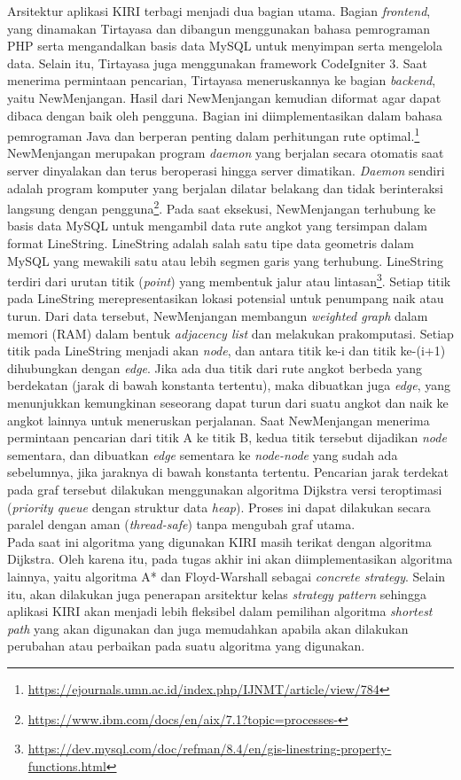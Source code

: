 \documentclass[a4paper,twoside]{article}
\begin{document}
\noindent
Arsitektur aplikasi KIRI terbagi menjadi dua bagian utama. Bagian \textit{frontend}, yang dinamakan Tirtayasa dan dibangun menggunakan bahasa pemrograman PHP serta mengandalkan basis data MySQL untuk menyimpan serta mengelola data. Selain itu, Tirtayasa juga menggunakan framework CodeIgniter 3. Saat menerima permintaan pencarian, Tirtayasa meneruskannya ke bagian \textit{backend}, yaitu NewMenjangan. Hasil dari NewMenjangan kemudian diformat agar dapat dibaca dengan baik oleh pengguna. Bagian ini diimplementasikan dalam bahasa pemrograman Java dan berperan penting dalam perhitungan rute optimal.\footnote{\url{https://ejournals.umn.ac.id/index.php/IJNMT/article/view/784}}
\\
NewMenjangan merupakan program \textit{daemon} yang berjalan secara otomatis saat server dinyalakan dan terus beroperasi hingga server dimatikan. \textit{Daemon} sendiri adalah program komputer yang berjalan dilatar belakang dan tidak berinteraksi langsung dengan pengguna\footnote{\url{https://www.ibm.com/docs/en/aix/7.1?topic=processes-}}. Pada saat eksekusi, NewMenjangan terhubung ke basis data MySQL untuk mengambil data rute angkot yang tersimpan dalam format LineString. LineString adalah salah satu tipe data geometris dalam MySQL yang mewakili satu atau lebih segmen garis yang terhubung. LineString terdiri dari urutan titik (\textit{point}) yang membentuk jalur atau lintasan\footnote{\url{https://dev.mysql.com/doc/refman/8.4/en/gis-linestring-property-functions.html}}. Setiap titik pada LineString merepresentasikan lokasi potensial untuk penumpang naik atau turun. Dari data tersebut, NewMenjangan membangun \textit{weighted graph} dalam memori (RAM) dalam bentuk \textit{adjacency list} dan melakukan prakomputasi. Setiap titik pada LineString menjadi akan \textit{node}, dan antara titik ke-i dan titik ke-(i+1) dihubungkan dengan \textit{edge}. Jika ada dua titik dari rute angkot berbeda yang berdekatan (jarak di bawah konstanta tertentu), maka dibuatkan juga \textit{edge}, yang menunjukkan kemungkinan seseorang dapat turun dari suatu angkot dan naik ke angkot lainnya untuk meneruskan perjalanan. 
\newpage
\noindent
Saat NewMenjangan menerima permintaan pencarian dari titik A ke titik B, kedua titik tersebut dijadikan \textit{node} sementara, dan dibuatkan \textit{edge} sementara ke \textit{node-node} yang sudah ada sebelumnya, jika jaraknya di bawah konstanta tertentu. Pencarian jarak terdekat pada graf tersebut dilakukan menggunakan algoritma Dijkstra versi teroptimasi (\textit{priority queue} dengan struktur data \textit{heap}). Proses ini dapat dilakukan secara paralel dengan aman (\textit{thread-safe}) tanpa mengubah graf utama.
\\
Pada saat ini algoritma yang digunakan KIRI masih terikat dengan algoritma Dijkstra. Oleh karena itu, pada tugas akhir ini akan diimplementasikan algoritma lainnya, yaitu algoritma A* dan Floyd-Warshall sebagai \textit{concrete strategy}. Selain itu, akan dilakukan juga penerapan arsitektur kelas \textit{strategy pattern} sehingga aplikasi KIRI akan menjadi lebih fleksibel dalam pemilihan algoritma \textit{shortest path} yang akan digunakan dan juga memudahkan apabila akan dilakukan perubahan atau perbaikan pada suatu algoritma yang digunakan.
\end{document}
